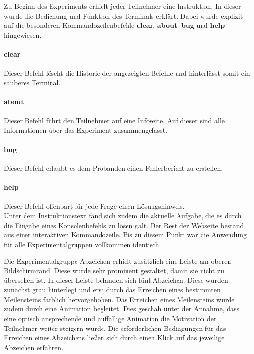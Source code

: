 Zu Beginn des Experiments erhielt jeder Teilnehmer eine Instruktion. In dieser wurde die Bedienung und Funktion des Terminals erklärt. Dabei wurde explizit auf die besonderen Kommandozeilenbefehle \textbf{clear}, \textbf{about}, \textbf{bug} und \textbf{help} hingewiesen.

\paragraph{clear}
Dieser Befehl löscht die Historie der angezeigten Befehle und hinterlässt somit ein sauberes Terminal.

\paragraph{about}
Dieser Befehl führt den Teilnehmer auf eine Infoseite. Auf dieser sind alle Informationen über das Experiment zusammengefasst.

\paragraph{bug}
Dieser Befehl erlaubt es dem Probanden einen Fehlerbericht zu erstellen.

\paragraph{help}
Dieser Befehl offenbart für jede Frage einen Lösungshinweis. \\



Unter dem Instruktionstext fand sich zudem die aktuelle Aufgabe, die es durch die Eingabe eines Konsolenbefehls zu lösen galt. Der Rest der Webseite bestand aus einer interaktiven Kommandozeile. Bis zu diesem Punkt war die Anwendung für alle Experimentalgruppen vollkommen identisch.

Die Experimentalgruppe Abzeichen erhielt zusätzlich eine Leiste am oberen Bildschirmrand. Diese wurde sehr prominent gestaltet, damit sie nicht zu übersehen ist. In dieser Leiste befanden sich fünf Abzeichen. Diese wurden zunächst grau hinterlegt und erst durch das Erreichen eines bestimmten Meilensteins farblich hervorgehoben. Das Erreichen eines Meilensteins wurde zudem durch eine Animation begleitet. Dies geschah unter der Annahme, dass eine optisch ansprechende und auffällige Animation die Motivation der Teilnehmer weiter steigern würde. Die erforderlichen Bedingungen für das Erreichen eines Abzeichens ließen sich durch einen Klick auf das jeweilige Abzeichen erfahren.

